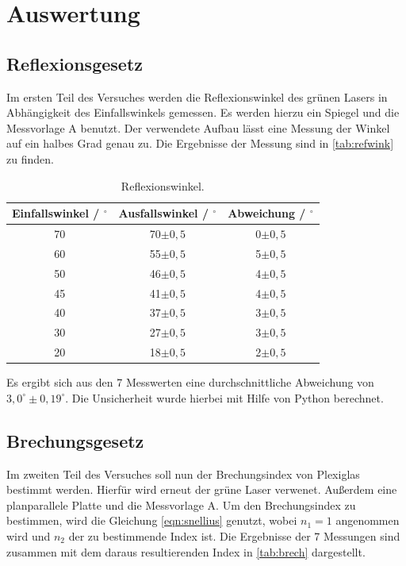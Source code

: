 \section{Auswertung}
\label{sec:Auswertung}

\subsection{Reflexionsgesetz}

Im ersten Teil des Versuches werden die Reflexionswinkel des grünen Lasers in Abhängigkeit des Einfallswinkels gemessen. Es werden hierzu ein Spiegel und die Messvorlage A
benutzt. Der verwendete Aufbau lässt eine Messung der Winkel auf ein halbes Grad genau zu. Die Ergebnisse der Messung sind in \autoref{tab:refwink} zu finden.

\begin{table}[H]
  \centering
  \caption{Reflexionswinkel.}
  \label{tab:refwink}
  \begin{tabular}{c c c}
    \toprule
    Einfallswinkel / $^{\circ}$ & Ausfallswinkel / $^{\circ}$ & Abweichung / $^{\circ}$\\
    \midrule
    70 & 70$\pm 0,5$ & 0$\pm 0,5$\\
    60 & 55$\pm 0,5$ & 5$\pm 0,5$\\
    50 & 46$\pm 0,5$ & 4$\pm 0,5$\\
    45 & 41$\pm 0,5$ & 4$\pm 0,5$\\
    40 & 37$\pm 0,5$ & 3$\pm 0,5$\\
    30 & 27$\pm 0,5$ & 3$\pm 0,5$\\
    20 & 18$\pm 0,5$ & 2$\pm 0,5$\\
    \bottomrule
  \end{tabular}
\end{table}

\noindent
Es ergibt sich aus den 7 Messwerten eine durchschnittliche Abweichung von $3,0^{\circ}\pm 0,19^{\circ}$. Die Unsicherheit wurde hierbei mit Hilfe von Python berechnet.

\subsection{Brechungsgesetz}

Im zweiten Teil des Versuches soll nun der Brechungsindex von Plexiglas bestimmt werden. Hierfür wird erneut der grüne Laser verwenet. Außerdem eine planparallele
Platte und die Messvorlage A. Um den Brechungsindex zu bestimmen, wird die Gleichung \eqref{eqn:snellius} genutzt, wobei $n_1 = 1$ angenommen wird und $n_2$ der
zu bestimmende Index ist. Die Ergebnisse der 7 Messungen sind zusammen mit dem daraus resultierenden Index in \autoref{tab:brech} dargestellt.


